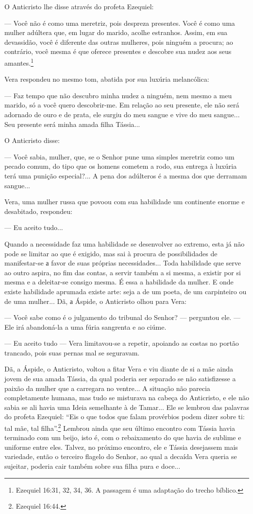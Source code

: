 O Anticristo lhe disse através do profeta Ezequiel:

--- Você não é como uma meretriz, pois despreza presentes. Você é como
uma mulher adúltera que, em lugar do marido, acolhe estranhos. Assim, em
sua devassidão, você é diferente das outras mulheres, pois ninguém a
procura; ao contrário, você mesma é que oferece presentes e descobre sua
nudez aos seus amantes.\footnote{Ezequiel 16:31, 32, 34, 36. A passagem
  é uma adaptação do trecho bíblico.}

Vera respondeu no mesmo tom, abatida por sua luxúria melancólica:

--- Faz tempo que não descubro minha nudez a ninguém, nem mesmo a meu
marido, só a você quero descobrir-me. Em relação ao seu presente, ele
não será adornado de ouro e de prata, ele surgiu do meu sangue e vive do
meu sangue... Seu presente será minha amada filha Tássia...

O Anticristo disse:

--- Você sabia, mulher, que, se o Senhor pune uma simples meretriz como
um pecado comum, do tipo que os homens cometem a rodo, sua entrega à
luxúria terá uma punição especial?... A pena dos adúlteros é a mesma dos
que derramam sangue...

Vera, uma mulher russa que povoou com sua habilidade um continente
enorme e desabitado, respondeu:

--- Eu aceito tudo...

Quando a necessidade faz uma habilidade se desenvolver ao extremo, esta
já não pode se limitar ao que é exigido, mas sai à procura de
possibilidades de manifestar-se а favor de suas próprias necessidades...
Toda habilidade que serve ao outro aspira, no fim das contas, a servir
também a si mesma, a existir por si mesma e a deleitar-se consigo mesma.
É essa a habilidade da mulher. E onde existe habilidade aprumada existe
arte: seja a de um poeta, de um carpinteiro ou de uma mulher... Dã, а
Áspide, o Anticristo olhou para Vera:

--- Você sabe como é o julgamento do tribunal do Senhor? --- perguntou
ele. --- Ele irá abandoná-la a uma fúria sangrenta e ao ciúme.

--- Eu aceito tudo --- Vera limitavou-se a repetir, apoiando as costas
no portão trancado, pois suas pernas mal se seguravam.

Dã, a Áspide, o Anticristo, voltou a fitar Vera e viu diante de si a mãe
ainda jovem de sua amada Tássia, da qual poderia ser separado se não
satisfizesse a paixão da mulher que a carregara no ventre... A situação
não parecia completamente humana, mas tudo se misturava na cabeça do
Anticristo, e ele não sabia se ali havia uma Ideia semelhante à de
Tamar... Ele se lembrou das palavras do profeta Ezequiel: ``Eis o que
todos que falam provérbios podem dizer sobre ti: tal mãe, tal
filha''.\footnote{Ezequiel 16:44.} Lembrou ainda que seu último encontro
com Tássia havia terminado com um beijo, isto é, com o rebaixamento do
que havia de sublime e uniforme entre eles. Talvez, no próximo encontro,
ele e Tássia desejassem mais variedade, então o terceiro flagelo do
Senhor, ao qual a decaída Vera queria se sujeitar, poderia cair também
sobre sua filha pura e doce...

